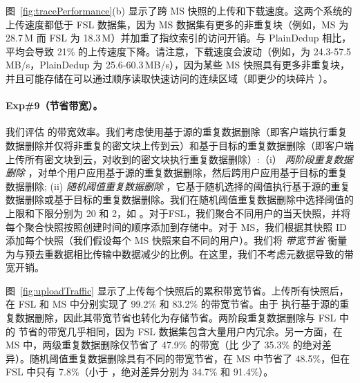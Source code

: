 图~\ref{fig:tracePerformance}(b) 显示了跨 MS 快照的上传和下载速度。这两个系统的上传速度都低于 FSL 数据集，因为 MS 数据集有更多的非重复块（例如，MS 为 28.7\,M 而 FSL 为 18.3\,M）并加重了指纹索引的访问开销。与 PlainDedup 相比，\sysname 平均会导致 21\% 的上传速度下降。请注意，下载速度会波动（例如，\sysname 为 24.3-57.5\,MB/s，PlainDedup 为 25.6-60.3\,MB/s），因为某些 MS 快照具有更多非重复块，并且可能存储在可以通过顺序读取快速访问的连续区域（即更少的块碎片 \cite{lillibridge13}）。

\paragraph{Exp\#9（节省带宽）。} 我们评估 \sysname 的带宽效率。我们考虑使用基于源的重复数据删除（即客户端执行重复数据删除并仅将非重复的密文块上传到云）和基于目标的重复数据删除（即客户端上传所有密文块到云，对收到的密文块执行重复数据删除）:（i）\textit{ 两阶段重复数据删除} \cite{li15}，对单个用户应用基于源的重复数据删除，然后跨用户应用基于目标的重复数据删除; (ii) \textit{ 随机阈值重复数据删除} \cite{harnik10}，它基于随机选择的阈值执行基于源的重复数据删除或基于目标的重复数据删除。我们在随机阈值重复数据删除中选择阈值的上限和下限分别为 20 和 2，如 \cite{harnik10}。对于FSL，我们聚合不同用户的当天快照，并将每个聚合快照按照创建时间的顺序添加到存储中。对于 MS，我们根据其快照 ID 添加每个快照（我们假设每个 MS 快照来自不同的用户）。我们将 \textit{ 带宽节省} 衡量为与预去重数据相比传输中数据减少的比例。在这里，我们不考虑元数据导致的带宽开销。

图~\ref{fig:uploadTraffic} 显示了上传每个快照后的累积带宽节省。上传所有快照后，\sysname 在 FSL 和 MS 中分别实现了 99.2\% 和 83.2\% 的带宽节省。由于 \sysname 执行基于源的重复数据删除，因此其带宽节省也转化为存储节省。两阶段重复数据删除与 FSL 中的 \sysname 节省的带宽几乎相同，因为 FSL 数据集包含大量用户内冗余。另一方面，在 MS 中，两级重复数据删除仅节省了 47.9\% 的带宽（比 \sysname 少了 35.3\% 的绝对差异）。随机阈值重复数据删除具有不同的带宽节省，在 MS 中节省了 48.5\%，但在 FSL 中只有 7.8\%（小于 \sysname，绝对差异分别为 34.7\% 和 91.4\%）。

